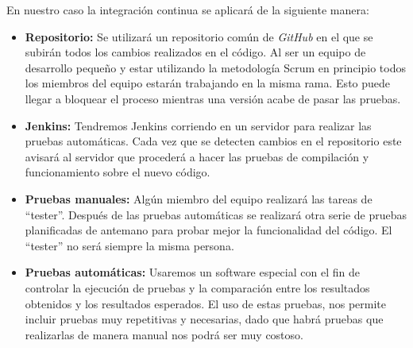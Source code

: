 En nuestro caso la integración continua se aplicará de la siguiente manera:

\begin{itemize}
	\item \textbf{Repositorio:} Se utilizará un repositorio común de \textit{GitHub} en el que se subirán todos los cambios realizados en el código. Al ser un equipo de desarrollo pequeño y estar utilizando la metodología Scrum en principio todos los miembros del equipo estarán trabajando en la misma rama. Esto puede llegar a bloquear el proceso mientras una versión acabe de pasar las pruebas.
	\item \textbf{Jenkins:} Tendremos Jenkins corriendo en un servidor para realizar las pruebas automáticas. Cada vez que se detecten cambios en el repositorio este avisará al servidor que procederá a hacer las pruebas de compilación y funcionamiento sobre el nuevo código.
	\item \textbf{Pruebas manuales:} Algún miembro del equipo realizará las tareas de "`tester"'. Después de las pruebas automáticas se realizará otra serie de pruebas planificadas de antemano para probar mejor la funcionalidad del código. El "`tester"' no será siempre la misma persona.
		\item \textbf{Pruebas automáticas:} Usaremos un software especial con el fin de controlar la ejecución de pruebas y la comparación entre los resultados obtenidos y los resultados esperados. El uso de estas pruebas, nos permite incluir pruebas muy repetitivas y necesarias, dado que habrá pruebas que realizarlas de manera manual nos podrá ser muy costoso.
\end{itemize}




